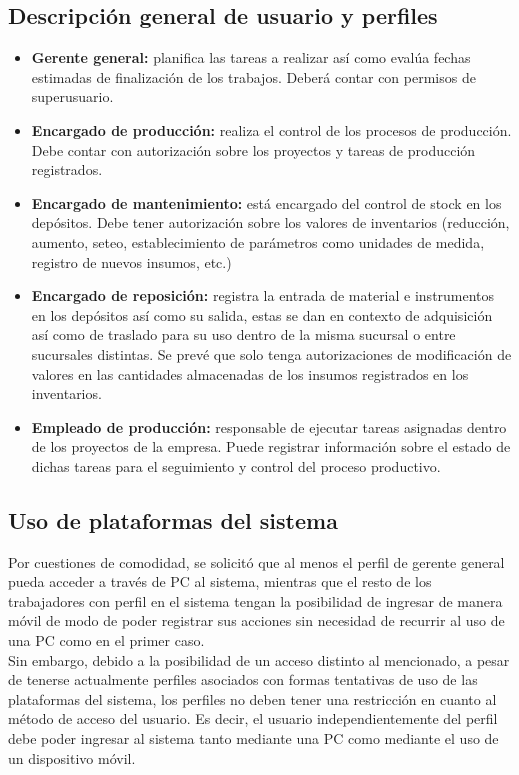 \documentclass[a4paper, 12pt,twoside]{report}  %
\numberwithin{equation}{subsection} %
\begin{document}
\subsection{Descripción general de usuario y perfiles}
\label{descripcion_usuarios_perfiles}

\begin{itemize}
\item \textbf{Gerente general:} planifica las tareas a realizar así como evalúa fechas estimadas de finalización de los trabajos. Deberá contar con permisos de superusuario.
\item \textbf{Encargado de producción:} realiza el control de los procesos de producción. Debe contar con autorización sobre los proyectos y tareas de producción registrados.
\item \textbf{Encargado de mantenimiento:} está encargado del control de stock en los depósitos. Debe tener autorización sobre los valores de inventarios (reducción, aumento, seteo, establecimiento de parámetros como unidades de medida, registro de nuevos insumos, etc.)
\item \textbf{Encargado de reposición:} registra la entrada de material e instrumentos en los depósitos así como su salida, estas se dan en contexto de adquisición así como de traslado para su uso dentro de la misma sucursal o entre sucursales distintas. Se prevé que solo tenga autorizaciones de modificación de valores en las cantidades almacenadas de los insumos registrados en los inventarios.
\item \textbf{Empleado de producción:}
responsable de ejecutar tareas asignadas dentro de los proyectos de la empresa. Puede registrar información sobre el estado de dichas tareas para el seguimiento y control del proceso productivo.
\end{itemize}

\subsection{Uso de plataformas del sistema} Por cuestiones de comodidad, se solicitó que al menos el perfil de gerente general pueda acceder a través de PC al sistema, mientras que el resto de los trabajadores con perfil en el sistema tengan la posibilidad de ingresar de manera móvil de modo de poder registrar sus acciones sin necesidad de recurrir al uso de una PC como en el primer caso.\\
\indent Sin embargo, debido a la posibilidad de un acceso distinto al mencionado, a pesar de tenerse actualmente perfiles asociados con formas tentativas de uso de las plataformas del sistema, los perfiles no deben tener una restricción en cuanto al método de acceso del usuario. Es decir, el usuario independientemente del perfil debe poder ingresar al sistema tanto mediante una PC como mediante el uso de un dispositivo móvil.
\end{document}
